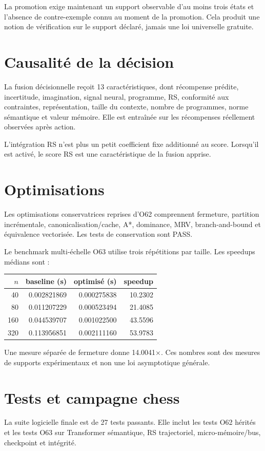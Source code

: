 \documentclass[11pt,a4paper]{article}
\begin{document}
La promotion exige maintenant un support observable d’au moins trois états et l’absence de contre-exemple connu au moment de la promotion. Cela produit une notion de vérification sur le support déclaré, jamais une loi universelle gratuite.

\section{Causalité de la décision}
La fusion décisionnelle reçoit 13 caractéristiques, dont récompense prédite, incertitude, imagination, signal neural, programme, RS, conformité aux contraintes, représentation, taille du contexte, nombre de programmes, norme sémantique et valeur mémoire. Elle est entraînée sur les récompenses réellement observées après action.

L’intégration RS n’est plus un petit coefficient fixe additionné au score. Lorsqu’il est activé, le score RS est une caractéristique de la fusion apprise.

\section{Optimisations}
Les optimisations conservatrices reprises d’O62 comprennent fermeture, partition incrémentale, canonicalisation/cache, A*, dominance, MRV, branch-and-bound et équivalence vectorisée. Les tests de conservation sont PASS.

Le benchmark multi-échelle O63 utilise trois répétitions par taille. Les speedups médians sont :
\begin{center}
\begin{tabular}{rrrr}
\toprule
$n$ & baseline (s) & optimisé (s) & speedup\\
\midrule
40 & 0.002821869 & 0.000275838 & 10.2302\\
80 & 0.011207229 & 0.000523494 & 21.4085\\
160 & 0.044539707 & 0.001022500 & 43.5596\\
320 & 0.113956851 & 0.002111160 & 53.9783\\
\bottomrule
\end{tabular}
\end{center}
Une mesure séparée de fermeture donne 14.0041$\times$. Ces nombres sont des mesures de supports expérimentaux et non une loi asymptotique générale.

\section{Tests et campagne chess}
La suite logicielle finale est de 27 tests passants. Elle inclut les tests O62 hérités et les tests O63 sur Transformer sémantique, RS trajectoriel, micro-mémoire/bus, checkpoint et intégrité.
\end{document}
